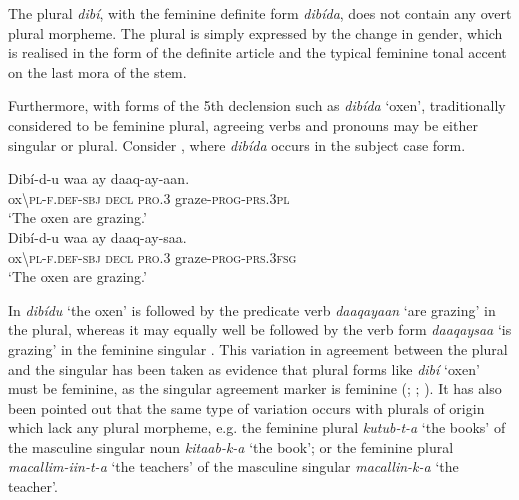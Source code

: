 \documentclass[output=paper]{langsci/langscibook}
\begin{document}
\largerpage
The plural \textit{dibí}, with the feminine definite form \textit{dibída}, does not contain any overt plural morpheme. The plural is simply expressed by the change in gender, which is realised in the form of the definite article and the typical feminine tonal accent on the last mora of the stem. 

\largerpage
Furthermore, with forms of the 5th declension such as \textit{dibída} ‘oxen’, traditionally considered to be feminine plural, agreeing verbs and pronouns may be either singular or plural. Consider , where \textit{dibída} occurs in the subject case form.

\ea\label{ex:nilsson:1}
\ea\label{ex:nilsson:1a}
\gll  Dibí-d-u             waa  ay{\rmfnm}   daaq-ay-aan.   \\
        ox{\textbackslash}\textsc{pl-f.def-sbj}  \textsc{decl}   \textsc{pro.3}   graze-\textsc{prog-prs.3pl}\\
\glt      ‘The oxen are grazing.’\\
\ex\label{ex:nilsson:1b}
\gll   Dibí-d-u        waa  ay   daaq-ay-saa.\\
       ox{\textbackslash}\textsc{pl-f.def-sbj}  \textsc{decl}   \textsc{pro.3}  graze-\textsc{prog-prs.3fsg}\\
\glt   ‘The oxen are grazing.’
\z
\z


In  \textit{dibídu} ‘the oxen’ is followed by the predicate verb \textit{daaqayaan} ‘are grazing’ in the plural, whereas it may equally well be followed by the verb form \textit{daaqaysaa} ‘is grazing’ in the feminine singular . This variation in agreement between the plural and the singular has been taken as evidence that plural forms like \textit{dibí} ‘oxen’ must be feminine, as the singular agreement marker is feminine (\citealt[259--260]{Hetzron1972}; \citealt[391--393]{ZwickyPullum1983}; \citealt[134--137]{Lecarme2002}). It has also been pointed out that the same type of variation occurs with plurals of  origin which lack any  plural morpheme, e.g. the feminine plural \textit{kutub-t-a} ‘the books’ of the masculine singular noun \textit{kitaab-k-a} ‘the book’; or the feminine plural \textit{macallim-iin-t-a} ‘the teachers’ of the masculine singular \textit{macallin-k-a} ‘the teacher’.
\end{document}
